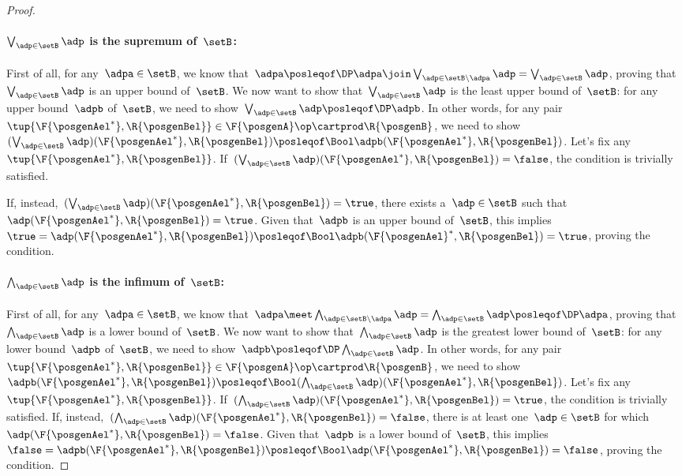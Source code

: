 \begin{proof}
    \paragraph*{$\bigvee_{\adp \in \setB} \adp$ is the supremum of~$\setB$:}
    First of all, for any~$\adpa\in \setB$, we know that~$\adpa\posleqof\DP \adpa \join \bigvee_{\adp \in \setB \backslash \adpa} \adp= \bigvee_{\adp \in \setB} \adp$, proving that~$\bigvee_{\adp \in \setB} \adp$ is an upper bound of~$\setB$.
    We now want to show that~$\bigvee_{\adp \in \setB} \adp$ is the least upper bound of~$\setB$: for any upper bound~$\adpb$ of~$\setB$, we need to show~$\bigvee_{\adp \in \setB} \adp \posleqof\DP\adpb$.
    In other words, for any pair~$\tup{\F{\posgenAel^*},\R{\posgenBel}}\in \F{\posgenA}\op\cartprod \R{\posgenB}$, we need to show~$(\bigvee_{\adp \in \setB} \adp)(\F{\posgenAel^*},\R{\posgenBel})\posleqof\Bool \adpb(\F{\posgenAel^*},\R{\posgenBel})$.
    Let's fix any~$\tup{\F{\posgenAel^*},\R{\posgenBel}}$.
    If~$(\bigvee_{\adp \in \setB} \adp)(\F{\posgenAel^*},\R{\posgenBel})=\false$, the condition is trivially satisfied.

    If, instead,~$(\bigvee_{\adp \in \setB} \adp)(\F{\posgenAel^*},\R{\posgenBel})=\true$, there exists a~$\adp\in \setB$ such that~$\adp(\F{\posgenAel^*},\R{\posgenBel})=\true$.
    Given that~$\adpb$ is an upper bound of~$\setB$, this implies~$\true=\adp(\F{\posgenAel^*},\R{\posgenBel})\posleqof\Bool \adpb(\F{\posgenAel}^*,\R{\posgenBel})=\true$, proving the condition.

    \paragraph*{$\bigwedge_{\adp \in \setB} \adp$ is the infimum of~$\setB$:}
    First of all, for any~$\adpa\in \setB$, we know that~$\adpa \meet \bigwedge_{\adp \in \setB \backslash \adpa} \adp= \bigwedge_{\adp \in \setB} \adp \posleqof\DP \adpa$, proving that~$\bigwedge_{\adp \in \setB} \adp$ is a lower bound of~$\setB$.
    We now want to show that~$\bigwedge_{\adp \in \setB} \adp$ is the greatest lower bound of~$\setB$: for any lower bound~$\adpb$ of~$\setB$, we need to show~$\adpb\posleqof\DP\bigwedge_{\adp \in \setB} \adp $.
    In other words, for any pair~$\tup{\F{\posgenAel^*},\R{\posgenBel}}\in \F{\posgenA}\op\cartprod \R{\posgenB}$, we need to show~$\adpb(\F{\posgenAel^*},\R{\posgenBel}) \posleqof\Bool (\bigwedge_{\adp \in \setB} \adp)(\F{\posgenAel^*},\R{\posgenBel})$.
    Let's fix any~$\tup{\F{\posgenAel^*},\R{\posgenBel}}$.
    If~$(\bigwedge_{\adp \in \setB} \adp)(\F{\posgenAel^*},\R{\posgenBel})=\true$, the condition is trivially satisfied.
    If, instead,~$(\bigwedge_{\adp \in \setB} \adp)(\F{\posgenAel^*},\R{\posgenBel})=\false$, there is at least one~$\adp\in \setB$ for which~$\adp(\F{\posgenAel^*},\R{\posgenBel})=\false$.
    Given that~$\adpb$ is a lower bound of~$\setB$, this implies~$\false=\adpb(\F{\posgenAel^*},\R{\posgenBel})\posleqof\Bool \adp(\F{\posgenAel^*},\R{\posgenBel})=\false$, proving the condition.
\end{proof}


